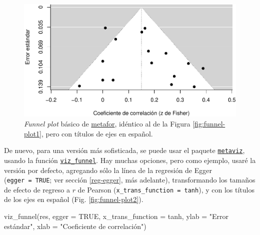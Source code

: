 \documentclass[
  bookmarksnumbered]{article}
\newenvironment{Shaded}{\begin{snugshade}}{\end{snugshade}}
\newcommand{\AttributeTok}[1]{\textcolor[rgb]{0.00,0.34,0.68}{#1}}
\newcommand{\ConstantTok}[1]{\textcolor[rgb]{0.67,0.33,0.00}{#1}}
\newcommand{\FunctionTok}[1]{\textcolor[rgb]{0.39,0.29,0.61}{#1}}
\newcommand{\NormalTok}[1]{\textcolor[rgb]{0.12,0.11,0.11}{#1}}
\newcommand{\StringTok}[1]{\textcolor[rgb]{0.75,0.01,0.01}{#1}}
\begin{document}
\begin{figure}
\centering
\includegraphics{Meta-analysis_files/figure-latex/funnel-plot1a-1.pdf}
\caption{\label{fig:funnel-plot1a}\emph{Funnel plot} básico de \href{https://www.metafor-project.org/doku.php}{metafor}, idéntico al de la Figura \ref{fig:funnel-plot1}, pero con títulos de ejes en español.}
\end{figure}

De nuevo, para una versión más sofisticada, se puede usar el paquete \href{https://cran.r-project.org/web/packages/metaviz/vignettes/metaviz.html}{\texttt{metaviz}}, usando la función \href{https://cran.r-project.org/web/packages/metaviz/vignettes/metaviz.html\#creating-funnel-plots-with-viz_funnel}{\texttt{viz\_funnel}}. Hay muchas opciones, pero como ejemplo, usaré la versión por defecto, agregando sólo la línea de la regresión de Egger (\texttt{egger\ =\ TRUE}; ver sección \ref{reg-egger}, más adelante), transformando los tamaños de efecto de regreso a \(r\) de Pearson (\texttt{x\_trans\_function\ =\ tanh}), y con los títulos de los ejes en español (Fig. \ref{fig:funnel-plot2}).

\begin{Shaded}
\begin{Highlighting}[]
\FunctionTok{viz\_funnel}\NormalTok{(res, }
           \AttributeTok{egger =} \ConstantTok{TRUE}\NormalTok{,}
           \AttributeTok{x\_trans\_function =}\NormalTok{ tanh,}
           \AttributeTok{ylab =} \StringTok{"Error estándar"}\NormalTok{,}
           \AttributeTok{xlab =} \StringTok{"Coeficiente de correlación"}\NormalTok{)}
\end{Highlighting}
\end{Shaded}
\end{document}
